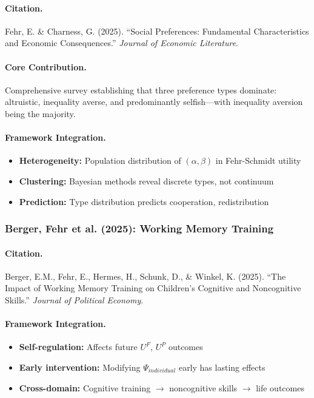 \paragraph{Citation.}
Fehr, E. \& Charness, G. (2025). ``Social Preferences: Fundamental 
Characteristics and Economic Consequences.'' \emph{Journal of Economic Literature}.

\paragraph{Core Contribution.}
Comprehensive survey establishing that three preference types dominate:
altruistic, inequality averse, and predominantly selfish---with inequality
aversion being the majority.

\paragraph{Framework Integration.}
\begin{itemize}
  \item \textbf{Heterogeneity:} Population distribution of $(\alpha, \beta)$ 
        in Fehr-Schmidt utility
  \item \textbf{Clustering:} Bayesian methods reveal discrete types, not continuum
  \item \textbf{Prediction:} Type distribution predicts cooperation, redistribution
\end{itemize}

\subsubsection{Berger, Fehr et al. (2025): Working Memory Training}

\paragraph{Citation.}
Berger, E.M., Fehr, E., Hermes, H., Schunk, D., \& Winkel, K. (2025).
``The Impact of Working Memory Training on Children's Cognitive and Noncognitive Skills.''
\emph{Journal of Political Economy}.

\paragraph{Framework Integration.}
\begin{itemize}
  \item \textbf{Self-regulation:} Affects future $U^F$, $U^P$ outcomes
  \item \textbf{Early intervention:} Modifying $\Psi_{individual}$ early has lasting effects
  \item \textbf{Cross-domain:} Cognitive training $\to$ noncognitive skills $\to$ life outcomes
\end{itemize}

